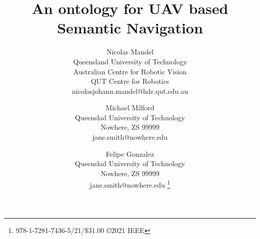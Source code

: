 \documentclass[twocolumn,letterpaper]{IEEEAerospaceCLS}  %
\begin{document}
\title{An ontology for UAV based  Semantic Navigation}

\author{%
    Nicolas Mandel\\
    Queensland University of Technology\\
    Australian Centre for Robotic Vision\\
    QUT Centre for Robotics\\
    nicolasjohann.mandel@hdr.qut.edu.au
    \and
    Michael Milford\\
    Queenslad University of Technology\\
    Nowhere, ZS 99999\\
    jane.smith@nowhere.edu
    \and
    Felipe Gonzalez\\
    Queenslad University of Technology\\
    Nowhere, ZS 99999\\
    jane.smith@nowhere.edu
    \thanks{\footnotesize 978-1-7281-7436-5/21/$\$31.00$ \copyright2021 IEEE}              %
}



\maketitle

\thispagestyle{plain}
\pagestyle{plain}



\maketitle

\thispagestyle{plain}
\pagestyle{plain}
\end{document}
